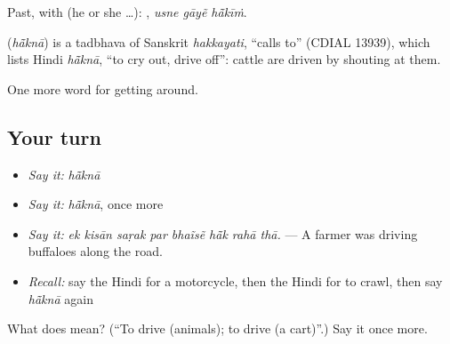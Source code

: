 Past, with  (he or she …):   , \emph{usne gāyẽ hā̃kīṁ}.

\begin{cousinweb}
\textbf{} (\emph{hā̃knā}) is a tadbhava of Sanskrit \emph{hakkayati}, \textquotedblleft{}calls to\textquotedblright{} (CDIAL 13939), which lists Hindi \emph{hā̃knā}, \textquotedblleft{}to cry out, drive off\textquotedblright{}: cattle are driven by shouting at them.
\end{cousinweb}

\begin{grammarlens}[title={What you've built}]
One more word for getting around.
\end{grammarlens}

\subsection*{Your turn}
\begin{itemize}
\raggedright
  \item \emph{Say it:} \emph{hā̃knā}
  \item \emph{Say it:} \emph{hā̃knā}, once more
  \item \emph{Say it:} \emph{ek kisān saṛak par bhaĩsẽ hā̃k rahā thā.} — A farmer was driving buffaloes along the road.
  \item \emph{Recall:} say the Hindi for a motorcycle, then the Hindi for to crawl, then say \emph{hā̃knā} again
\end{itemize}

\begin{tcolorbox}[breakable,colback=teal!4,colframe=teal!35!black,title={Before you move on}]
What does  mean? (\textquotedblleft{}To drive (animals); to drive (a cart)\textquotedblright{}.) Say it once more.
\end{tcolorbox}

